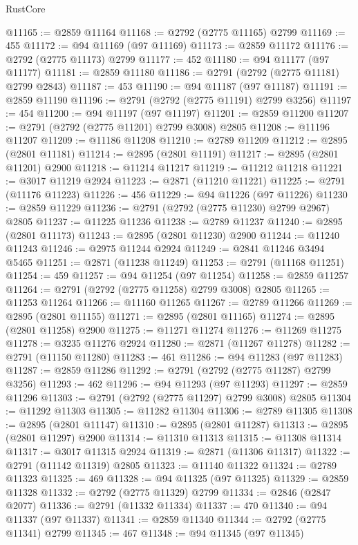 \begin{lexlean}{RustCore}
\begin{coremodule}
@11165 := @2859 @11164
@11168 := @2792 (@2775 @11165) @2799
@11169 := 455
@11172 := @94 @11169 (@97 @11169)
@11173 := @2859 @11172
@11176 := @2792 (@2775 @11173) @2799
@11177 := 452
@11180 := @94 @11177 (@97 @11177)
@11181 := @2859 @11180
@11186 := @2791 (@2792 (@2775 @11181) @2799 @2843)
@11187 := 453
@11190 := @94 @11187 (@97 @11187)
@11191 := @2859 @11190
@11196 := @2791 (@2792 (@2775 @11191) @2799 @3256)
@11197 := 454
@11200 := @94 @11197 (@97 @11197)
@11201 := @2859 @11200
@11207 := @2791 (@2792 (@2775 @11201) @2799 @3008) @2805
@11208 := @11196 @11207
@11209 := @11186 @11208
@11210 := @2789 @11209
@11212 := @2895 (@2801 @11181)
@11214 := @2895 (@2801 @11191)
@11217 := @2895 (@2801 @11201) @2900
@11218 := @11214 @11217
@11219 := @11212 @11218
@11221 := @3017 @11219 @2924
@11223 := @2871 (@11210 @11221)
@11225 := @2791 (@11176 @11223)
@11226 := 456
@11229 := @94 @11226 (@97 @11226)
@11230 := @2859 @11229
@11236 := @2791 (@2792 (@2775 @11230) @2799 @2967) @2805
@11237 := @11225 @11236
@11238 := @2789 @11237
@11240 := @2895 (@2801 @11173)
@11243 := @2895 (@2801 @11230) @2900
@11244 := @11240 @11243
@11246 := @2975 @11244 @2924
@11249 := @2841 @11246 @3494 @5465
@11251 := @2871 (@11238 @11249)
@11253 := @2791 (@11168 @11251)
@11254 := 459
@11257 := @94 @11254 (@97 @11254)
@11258 := @2859 @11257
@11264 := @2791 (@2792 (@2775 @11258) @2799 @3008) @2805
@11265 := @11253 @11264
@11266 := @11160 @11265
@11267 := @2789 @11266
@11269 := @2895 (@2801 @11155)
@11271 := @2895 (@2801 @11165)
@11274 := @2895 (@2801 @11258) @2900
@11275 := @11271 @11274
@11276 := @11269 @11275
@11278 := @3235 @11276 @2924
@11280 := @2871 (@11267 @11278)
@11282 := @2791 (@11150 @11280)
@11283 := 461
@11286 := @94 @11283 (@97 @11283)
@11287 := @2859 @11286
@11292 := @2791 (@2792 (@2775 @11287) @2799 @3256)
@11293 := 462
@11296 := @94 @11293 (@97 @11293)
@11297 := @2859 @11296
@11303 := @2791 (@2792 (@2775 @11297) @2799 @3008) @2805
@11304 := @11292 @11303
@11305 := @11282 @11304
@11306 := @2789 @11305
@11308 := @2895 (@2801 @11147)
@11310 := @2895 (@2801 @11287)
@11313 := @2895 (@2801 @11297) @2900
@11314 := @11310 @11313
@11315 := @11308 @11314
@11317 := @3017 @11315 @2924
@11319 := @2871 (@11306 @11317)
@11322 := @2791 (@11142 @11319) @2805
@11323 := @11140 @11322
@11324 := @2789 @11323
@11325 := 469
@11328 := @94 @11325 (@97 @11325)
@11329 := @2859 @11328
@11332 := @2792 (@2775 @11329) @2799
@11334 := @2846 (@2847 @2077)
@11336 := @2791 (@11332 @11334)
@11337 := 470
@11340 := @94 @11337 (@97 @11337)
@11341 := @2859 @11340
@11344 := @2792 (@2775 @11341) @2799
@11345 := 467
@11348 := @94 @11345 (@97 @11345)

\end{coremodule}
\end{lexlean}
